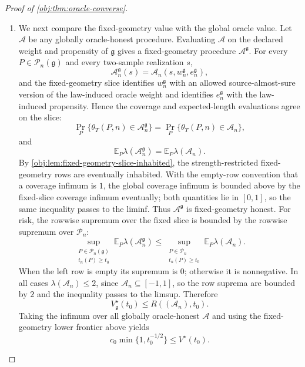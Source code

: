 \begin{proof}[Proof of \cref{obj:thm:oracle-converse}]
\begin{enumerate}
\item We next compare the fixed-geometry value with the global oracle value. Let
\(\mathcal A\) be any globally oracle-honest procedure. Evaluating \(\mathcal A\) on the
declared weight and propensity of \(\mathfrak g\) gives a fixed-geometry procedure
\(\mathcal A^{\mathfrak g}\). For every \(P\in\mathcal P_n(\mathfrak g)\) and every
two-sample realization \(s\),
\[
  \mathcal A^{\mathfrak g}_n(s)
  =
  \mathcal A_n(s,w^{\mathfrak g}_n,e^{\mathfrak g}_n),
\]
and the fixed-geometry slice identifies \(w^{\mathfrak g}_n\) with an allowed
source-almost-sure version of the law-induced oracle weight and identifies
\(e^{\mathfrak g}_n\) with the law-induced propensity. Hence the coverage and expected-length
evaluations agree on the slice:
\[
  \Pr_P\{\theta_T(P,n)\in \mathcal A^{\mathfrak g}_n\}
  =
  \Pr_P\{\theta_T(P,n)\in \mathcal A_n\},
\]
and
\[
  \mathbb E_P\lambda(\mathcal A^{\mathfrak g}_n)
  =
  \mathbb E_P\lambda(\mathcal A_n).
\]
By \cref{obj:lem:fixed-geometry-slice-inhabited}, the strength-restricted fixed-geometry
rows are eventually inhabited. With the empty-row convention that a coverage infimum is
\(1\), the global coverage infimum is bounded above by the fixed-slice coverage infimum
eventually; both quantities lie in \([0,1]\), so the same inequality passes to the liminf.
Thus \(\mathcal A^{\mathfrak g}\) is fixed-geometry honest. For risk, the rowwise supremum
over the fixed slice is bounded by the rowwise supremum over \(\mathcal P_n\):
\[
  \sup_{\substack{P\in\mathcal P_n(\mathfrak g)\\ t_n(P)\ge t_0}}
  \mathbb E_P\lambda(\mathcal A^{\mathfrak g}_n)
  \le
  \sup_{\substack{P\in\mathcal P_n\\ t_n(P)\ge t_0}}
  \mathbb E_P\lambda(\mathcal A_n).
\]
When the left row is empty its supremum is \(0\); otherwise it is nonnegative. In all cases
\(\lambda(\mathcal A_n)\le 2\), since \(\mathcal A_n\subseteq[-1,1]\), so the row suprema
are bounded by \(2\) and the inequality passes to the limsup. Therefore
\[
  V_{\mathfrak g}^\star(t_0)
  \le
  R((\mathcal A_n),t_0).
\]
Taking the infimum over all globally oracle-honest \(\mathcal A\) and using the fixed-geometry
lower frontier above yields
\[
  c_0\min\{1,t_0^{-1/2}\}
  \le
  V^\star(t_0).
\] %


\end{enumerate}
\end{proof}

